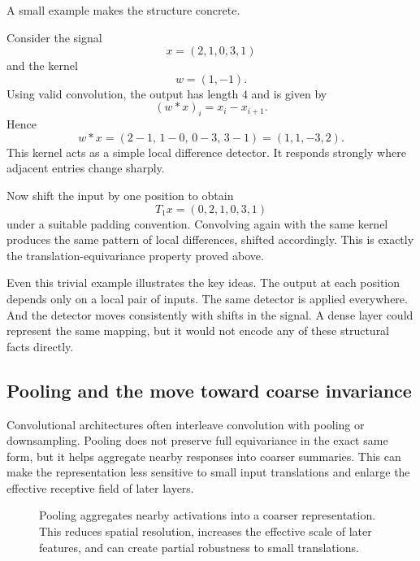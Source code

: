 A small example makes the structure concrete.

\begin{example}
Consider the signal
\[
 x = (2,1,0,3,1)
\]
and the kernel
\[
 w = (1,-1).
\]
Using valid convolution, the output has length $4$ and is given by
\[
 (w*x)_i = x_i - x_{i+1}.
\]
Hence
\[
 w*x = (2-1,\,1-0,\,0-3,\,3-1) = (1,1,-3,2).
\]
This kernel acts as a simple local difference detector.
It responds strongly where adjacent entries change sharply.

Now shift the input by one position to obtain
\[
 T_1x = (0,2,1,0,3,1)
\]
under a suitable padding convention.
Convolving again with the same kernel produces the same pattern of local differences, shifted accordingly.
This is exactly the translation-equivariance property proved above.
\end{example}

\medskip

Even this trivial example illustrates the key ideas.
The output at each position depends only on a local pair of inputs.
The same detector is applied everywhere.
And the detector moves consistently with shifts in the signal.
A dense layer could represent the same mapping, but it would not encode any of these structural facts directly.

\subsection*{Pooling and the move toward coarse invariance}

Convolutional architectures often interleave convolution with pooling or downsampling.
Pooling does not preserve full equivariance in the exact same form, but it helps aggregate nearby responses into coarser summaries.
This can make the representation less sensitive to small input translations and enlarge the effective receptive field of later layers.

\begin{figure}[t]
\centering
{}
\caption{Pooling aggregates nearby activations into a coarser representation.
This reduces spatial resolution, increases the effective scale of later features, and can create partial robustness to small translations.}
\label{fig:conv-pooling}
\end{figure}


